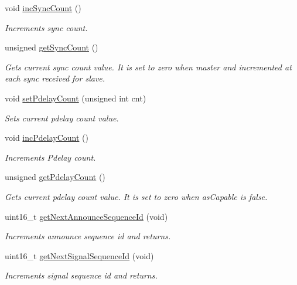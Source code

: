 \begin{DoxyCompactItemize}
void \hyperlink{class_common_port_adc84a20b20a67b0e1bb87313c7e923fd}{inc\+Sync\+Count} ()
\begin{DoxyCompactList}\small\item\em Increments sync count. \end{DoxyCompactList}\item 
unsigned \hyperlink{class_common_port_ae83aa3b2d155e97810ccccd57e9f13ca}{get\+Sync\+Count} ()
\begin{DoxyCompactList}\small\item\em Gets current sync count value. It is set to zero when master and incremented at each sync received for slave. \end{DoxyCompactList}\item 
void \hyperlink{class_common_port_aec03e751f24fcab6ae26789a1ae727ac}{set\+Pdelay\+Count} (unsigned int cnt)
\begin{DoxyCompactList}\small\item\em Sets current pdelay count value. \end{DoxyCompactList}\item 
void \hyperlink{class_common_port_a7d0d2b5b78e5c0847b37753bb359d6a4}{inc\+Pdelay\+Count} ()
\begin{DoxyCompactList}\small\item\em Increments Pdelay count. \end{DoxyCompactList}\item 
unsigned \hyperlink{class_common_port_acb83433716949af5f97d373d8ca6ee8d}{get\+Pdelay\+Count} ()
\begin{DoxyCompactList}\small\item\em Gets current pdelay count value. It is set to zero when as\+Capable is false. \end{DoxyCompactList}\item 
uint16\+\_\+t \hyperlink{class_common_port_a18883d9fb2db39824c9c291e142955f9}{get\+Next\+Announce\+Sequence\+Id} (void)
\begin{DoxyCompactList}\small\item\em Increments announce sequence id and returns. \end{DoxyCompactList}\item 
uint16\+\_\+t \hyperlink{class_common_port_abf938254e2cf21f85fbf20f1287e5e31}{get\+Next\+Signal\+Sequence\+Id} (void)
\begin{DoxyCompactList}\small\item\em Increments signal sequence id and returns. \end{DoxyCompactList}\item 

\end{DoxyCompactItemize}
